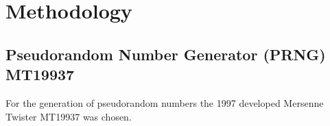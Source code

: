 \section{Methodology}

\subsection{Pseudorandom Number Generator (PRNG) MT19937}\label{ssec:methodology_rng_mt19937}

For the generation of pseudorandom numbers the 1997 developed Mersenne\,Twister MT19937 was chosen.\cite{educativeMersenneTwister}\cite{Makoto_Takuji}